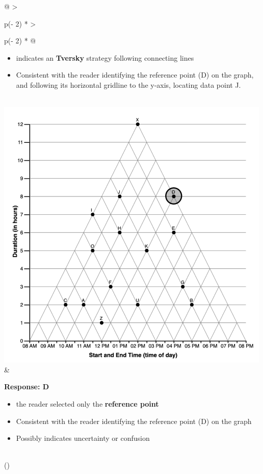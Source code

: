 \documentclass[
  letterpaper,
  DIV=11,
  numbers=noendperiod]{scrreprt}
\providecommand{\tightlist}{%
  \setlength{\itemsep}{0pt}\setlength{\parskip}{0pt}}\usepackage{longtable,booktabs,array}
\begin{document}
\begin{longtable}[]{@{}
  >{\raggedright\arraybackslash}p{(\columnwidth - 2\tabcolsep) * }
  >{\raggedright\arraybackslash}p{(\columnwidth - 2\tabcolsep) * }@{}}
\begin{minipage}[t]{\linewidth}
\begin{itemize}
\tightlist
\item
  indicates an \textbf{Tversky} strategy following connecting lines
\item
  Consistent with the reader identifying the reference point (D) on the
  graph, and following its horizontal gridline to the y-axis, locating
  data point J.
\end{itemize}
\end{minipage} \\
\includegraphics[width=5.20833in,height=\textheight]{analysis/SGC3A/static/interpretations/Q2_111_D.png}
& \begin{minipage}[t]{\linewidth}\raggedright
\textbf{Response: D}

\begin{itemize}
\tightlist
\item
  the reader selected only the \textbf{reference point}
\item
  Consistent with the reader identifying the reference point (D) on the
  graph
\item
  Possibly indicates uncertainty or confusion
\end{itemize}
\end{minipage} \\
\bottomrule()
\end{longtable}
\end{document}
